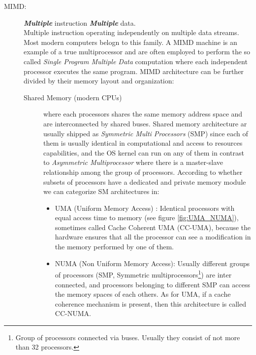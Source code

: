 \begin{description}
\item[MIMD:] \textit{\textbf{Multiple}} instruction \textit{\textbf{Multiple}} data. \hfill \\ Multiple instruction operating
independently on multiple data streams. Most modern computers belogn to this family. A MIMD machine is an example of a true multiprocessor and are often employed to perform the so called \textit{Single Program Multiple Data} computation where each independent processor executes the same program.
MIMD architecture can be further divided by  their memory layout and organization:
\begin{description}
	\item [Shared Memory (modern CPUs)] where each processors shares the same memory address space and are interconnected by shared buses. 
	Shared memory architecture ar usually shipped as \textit{Symmetric Multi Processors} (SMP) since each of them is usually identical in computational and access to resources capabilities, and the OS kernel can run on any of them in contrast to \textit{Asymmetric Multiprocessor} where there is a master-slave relationship  among the group of processors. According to whether subsets of processors have a dedicated and private memory module we can categorize SM architectures in:	
	\begin{itemize}
		\item UMA (Uniform Memory Access) : Identical processors with equal
		access time to memory (see figure \ref{fig:UMA_NUMA}),
		sometimes called  Cache Coherent UMA (CC-UMA), because the
		hardware ensures that all the processor can see a modification in the memory 	performed by one of them.
		\item NUMA (Non Uniform Memory Access): Usually different groups
		of processors (SMP, Symmetric multiprocessors\footnote{Group of processors connected via buses. Usually they consist of not more than 32 processors.}) are inter connected, and processors belonging to different SMP can access the memory spaces of each others. As for UMA, if a cache coherence mechanism  is present, then this architecture is called CC-NUMA.
		 \begin{figure}[b]
			\caption[Shared memory architectures.]{UMA and NUMA shared memory architecture.}
			\label{class12}
			\centering
			\begin{subfigure}[b]{0.5\textwidth}
				\centering

\end{subfigure}
\end{figure}
\end{itemize}
\end{description}
\end{description}
